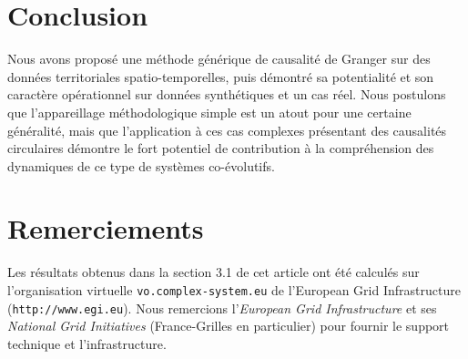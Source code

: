\documentclass[french]{./sageo}
\begin{document}
\section{Conclusion}

Nous avons proposé une méthode générique de causalité de Granger sur des données territoriales spatio-temporelles, puis démontré sa potentialité et son caractère opérationnel sur données synthétiques et un cas réel. Nous postulons que l'appareillage méthodologique simple est un atout pour une certaine généralité, mais que l'application à ces cas complexes présentant des causalités circulaires démontre le fort potentiel de contribution à la compréhension des dynamiques de ce type de systèmes co-évolutifs.



\section*{Remerciements}

Les résultats obtenus dans la section 3.1 de cet article ont été calculés sur l'organisation virtuelle \texttt{vo.complex-system.eu} de l'European Grid Infrastructure (\texttt{http://www.egi.eu}). Nous remercions l'\textit{European Grid Infrastructure} et ses \textit{National Grid Initiatives} (France-Grilles en particulier) pour fournir le support technique et l'infrastructure.












\end{document}
